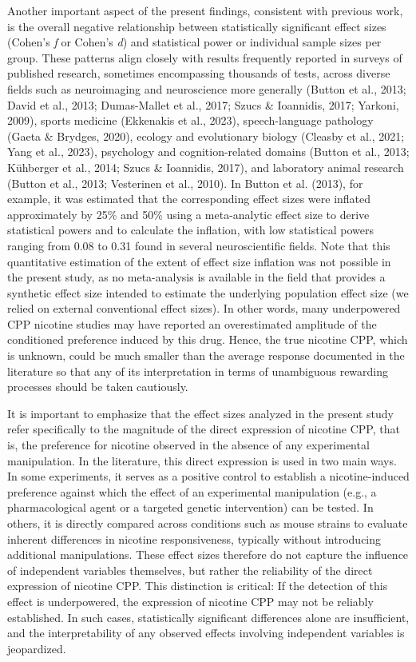 \documentclass[authordate, meta, issue]{jote-new-article}
\begin{document}
	Another important aspect of the present findings, consistent with previous work, is the overall negative relationship between statistically significant effect sizes (Cohen's \emph{f} or Cohen's \emph{d}) and statistical power or individual sample sizes per group. These patterns align closely with results frequently reported in surveys of published research, sometimes encompassing thousands of tests, across diverse fields such as neuroimaging and neuroscience more generally (Button et al., 2013; David et al., 2013; Dumas-Mallet et al., 2017; Szucs \& Ioannidis, 2017; Yarkoni, 2009), sports medicine (Ekkenakis et al., 2023), speech-language pathology (Gaeta \& Brydges, 2020), ecology and evolutionary biology (Cleasby et al., 2021; Yang et al., 2023), psychology and cognition-related domains (Button et al., 2013; Kühberger et al., 2014; Szucs \& Ioannidis, 2017), and laboratory animal research (Button et al., 2013; Vesterinen et al., 2010). In Button et al. (2013), for example, it was estimated that the corresponding effect sizes were inflated approximately by 25\% and 50\% using a meta-analytic effect size to derive statistical powers and to calculate the inflation, with low statistical powers ranging from 0.08 to 0.31 found in several neuroscientific fields. Note that this quantitative estimation of the extent of effect size inflation was not possible in the present study, as no meta-analysis is available in the field that provides a synthetic effect size intended to estimate the underlying population effect size (we relied on external conventional effect sizes). In other words, many underpowered CPP nicotine studies may have reported an overestimated amplitude of the conditioned preference induced by this drug. Hence, the true nicotine CPP, which is unknown, could be much smaller than the average response documented in the literature so that any of its interpretation in terms of unambiguous rewarding processes should be taken cautiously.



	It is important to emphasize that the effect sizes analyzed in the present study refer specifically to the magnitude of the direct expression of nicotine CPP, that is, the preference for nicotine observed in the absence of any experimental manipulation. In the literature, this direct expression is used in two main ways. In some experiments, it serves as a positive control to establish a nicotine-induced preference against which the effect of an experimental manipulation (e.g., a pharmacological agent or a targeted genetic intervention) can be tested. In others, it is directly compared across conditions such as mouse strains to evaluate inherent differences in nicotine responsiveness, typically without introducing additional manipulations. These effect sizes therefore do not capture the influence of independent variables themselves, but rather the reliability of the direct expression of nicotine CPP. This distinction is critical: If the detection of this effect is underpowered, the expression of nicotine CPP may not be reliably established. In such cases, statistically significant differences alone are insufficient, and the interpretability of any observed effects involving independent variables is jeopardized.
\end{document}
